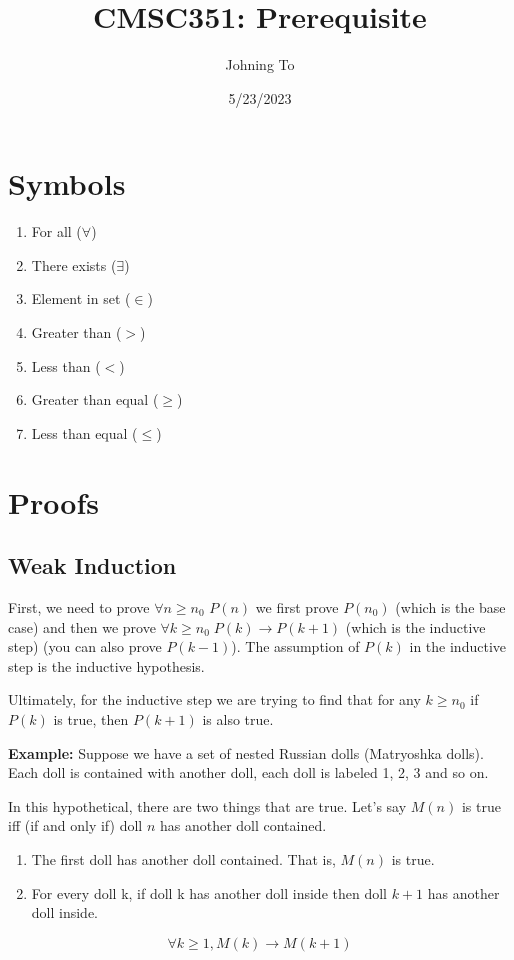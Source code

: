\documentclass{article}
\title{CMSC351: Prerequisite}
\author{Johning To}
\date{5/23/2023}
\begin{document}
\maketitle

\tableofcontents
\clearpage

\section{Symbols}
\begin{enumerate}
  \item For all ($ \forall $)
  \item There exists ($ \exists $)
  \item Element in set ($ \in $)
  \item Greater than ($ > $)
  \item Less than ($ < $)
  \item Greater than equal ($ \ge $)
  \item Less than equal ($ \le $)
\end{enumerate}

\clearpage

\section{Proofs}
\subsection {Weak Induction}
First, we need to prove $ \forall n \ge n_0 $ $ P(n) $ we first prove $ P(n_0) $ (which is the base case) and
then we prove $ \forall k \ge n_0 \; P(k) \rightarrow P(k+1) $ (which is the inductive step) (you can also prove $ P(k - 1) $).
The assumption of $ P(k) $ in the inductive step is the inductive hypothesis.

Ultimately, for the inductive step we are trying to find that for any $ k \ge n_0 $ if $ P(k) $ is true, then $ P(k + 1) $ is also true. 

\textbf{Example:}
Suppose we have a set of nested Russian dolls (Matryoshka dolls). Each doll is contained with another doll, each doll is labeled 1, 2, 3 and so on. 

In this hypothetical, there are two things that are true. Let's say $ M(n) $ is true iff (if and only if) doll $ n $ has another doll contained.
\begin{enumerate}[label=(\alph*)]
\item The first doll has another doll contained. That is, $ M(n) $ is true.

\item For every doll k, if doll k has another doll inside then doll $ k + 1 $ has another doll inside.
\end{enumerate}
$$ \forall k \ge 1, M(k) \rightarrow M(k + 1) $$
\end{document}

